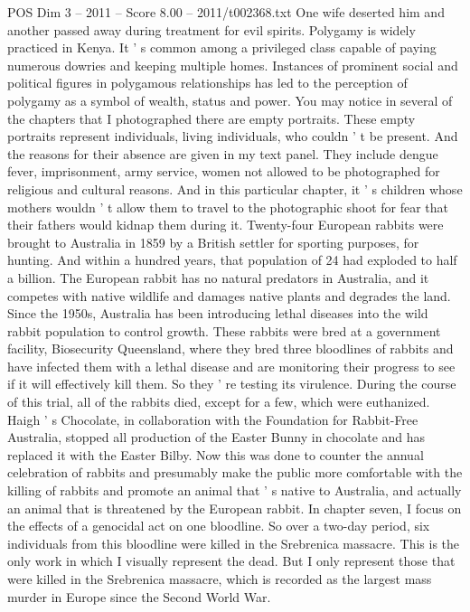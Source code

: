 \begin{textsample}{POS Dim 3 – 2011 – Score 8.00 – 2011/t002368.txt}
One wife deserted him and another passed away during treatment for evil spirits.
Polygamy is widely practiced in Kenya.
It ' s common among a privileged class capable of paying numerous dowries and keeping multiple homes.
Instances of prominent social and political figures in polygamous relationships has led to the perception of polygamy as a symbol of wealth, status and power.
You may notice in several of the chapters that I photographed there are empty portraits.
These empty portraits represent individuals, living individuals, who couldn ' t be present.
And the reasons for their absence are given in my text panel.
They include dengue fever, imprisonment, army service, women not allowed to be photographed for religious and cultural reasons.
And in this particular chapter, it ' s children whose mothers wouldn ' t allow them to travel to the photographic shoot for fear that their fathers would kidnap them during it.
Twenty-four European rabbits were brought to Australia in 1859 by a British settler for sporting purposes, for hunting.
And within a hundred years, that population of 24 had exploded to half a billion.
The European rabbit has no natural predators in Australia, and it competes with native wildlife and damages native plants and degrades the land.
Since the 1950s, Australia has been introducing lethal diseases into the wild rabbit population to control growth.
These rabbits were bred at a government facility, Biosecurity Queensland, where they bred three bloodlines of rabbits and have infected them with a lethal disease and are monitoring their progress to see if it will effectively kill them.
So they ' re testing its virulence.
During the course of this trial, all of the rabbits died, except for a few, which were euthanized.
Haigh ' s Chocolate, in collaboration with the Foundation for Rabbit-Free Australia, stopped all production of the Easter Bunny in chocolate and has replaced it with the Easter Bilby.
Now this was done to counter the annual celebration of rabbits and presumably make the public more comfortable with the killing of rabbits and promote an animal that ' s native to Australia, and actually an animal that is threatened by the European rabbit.
In chapter seven, I focus on the effects of a genocidal act on one bloodline.
So over a two-day period, six individuals from this bloodline were killed in the Srebrenica massacre.
This is the only work in which I visually represent the dead.
But I only represent those that were killed in the Srebrenica massacre, which is recorded as the largest mass murder in Europe since the Second World War.

\end{textsample}
